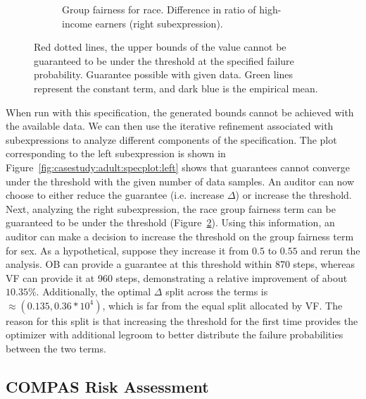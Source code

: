 \begin{figure}
\begin{subfigure}{0.48\linewidth}
    \caption{Group fairness for race. Difference in ratio of high-income earners (right subexpression). }
    \label{fig:casestudy:adult:specplot:right}
    \end{subfigure}
    \caption{\figtop{} Red dotted lines, the upper bounds of the value cannot be guaranteed to be under the threshold at the specified failure probability. \figbottom{} Guarantee possible with given data. Green lines represent the constant term, and dark blue is the empirical mean.}
\end{figure}
When run with this specification, the generated bounds cannot be achieved with the available data. 
We can then use the iterative refinement associated with subexpressions to analyze different components of the specification. 
The plot corresponding to the left subexpression is shown in Figure~\ref{fig:casestudy:adult:specplot:left} shows that guarantees cannot converge under the threshold with the given number of data samples. 
An auditor can now choose to either reduce the guarantee (i.e. increase $\Delta$) or increase the threshold. 
Next, analyzing the right subexpression, the race group fairness term can be guaranteed to be under the threshold (Figure~\ref{fig:casestudy:adult:specplot:right}).
Using this information, an auditor can make a decision to increase the threshold on the group fairness term for sex. 
As a hypothetical, suppose they increase it from $0.5$ to $0.55$ and rerun the analysis.
OB can provide a guarantee at this threshold within 870 steps, whereas VF can provide it at 960 steps, demonstrating a relative improvement of about $\mathbf{10.35\%}$.
Additionally, the optimal $\Delta$ split across the terms is $\approx (0.135, 0.36 * 10^4)$, which is far from the equal split allocated by VF.
The reason for this split is that increasing the threshold for the first time provides the optimizer with additional legroom to better distribute the failure probabilities between the two terms.

\subsection{COMPAS Risk Assessment}

